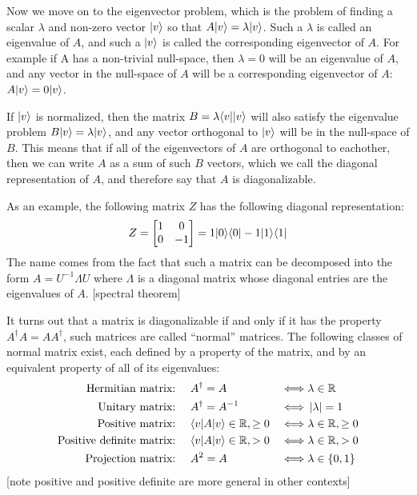 Now we move on to the eigenvector problem, which is the problem of finding a scalar $\lambda$ and non-zero vector $| v \rangle$ so that $A| v \rangle=\lambda| v \rangle$. Such a $\lambda$ is called an eigenvalue of $A$, and such a $| v \rangle$ is called the corresponding eigenvector of $A$. For example if A has a non-trivial null-space, then $\lambda=0$ will be an eigenvalue of $A$, and any vector in the null-space of $A$ will be a corresponding eigenvector of $A$: $A| v \rangle = 0| v \rangle$.

If $| v \rangle$ is normalized, then the matrix $B=\lambda\langle v || v \rangle$ will also satisfy the eigenvalue problem $B| v \rangle=\lambda| v \rangle$, and any vector orthogonal to $| v \rangle$ will be in the null-space of $B$. This means that if all of the eigenvectors of $A$ are orthogonal to eachother, then we can write $A$ as a sum of such $B$ vectors, which we call the diagonal representation of $A$, and therefore say that $A$ is diagonalizable.

As an example, the following matrix $Z$ has the following diagonal representation:
\begin{align*}
Z = \left[\begin{matrix}
1&0\\
0&-1
\end{matrix}\right] = 1| 0 \rangle\langle 0 | - 1| 1 \rangle\langle 1 |
\end{align*}
The name comes from the fact that such a matrix can be decomposed into the form $A = U^{-1}\Lambda U$ where $\Lambda$ is a diagonal matrix whose diagonal entries are the eigenvalues of $A$.
[spectral theorem]

It turns out that a matrix is diagonalizable if and only if it has the property $A^\dagger A = AA^\dagger$, such matrices are called ``normal'' matrices. The following classes of normal matrix exist, each defined by a property of the matrix, and by an equivalent property of all of its eigenvalues:
\begin{align*}
\text{Hermitian matrix:\ }&&& A^\dagger = A & \iff& \lambda \in \mathbb{R} \\
\text{Unitary matrix:\ }&&& A^\dagger = A^{-1} & \iff& \left| \lambda \right|=1 \\
\text{Positive matrix:\ }&&& \langle v |A| v \rangle \in \mathbb{R}, \geq 0 & \iff& \lambda \in \mathbb{R}, \geq 0 \\
\text{Positive definite matrix:\ }&&& \langle v |A| v \rangle \in \mathbb{R}, > 0 & \iff& \lambda \in \mathbb{R}, > 0 \\
\text{Projection matrix:\ }&&& A^2 = A & \iff& \lambda \in \{0, 1\} \\
\end{align*}
[note positive and positive definite are more general in other contexts]

